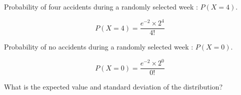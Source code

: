 \documentclass[]{article}
\begin{document}

Probability of four accidents during a randomly selected week : $ P(X = 4)$.

\[ P(X=4) =  \frac{e^{-2} \times 2^4}{4!}  \]



Probability of no accidents during a randomly selected week : $ P(X = 0)$.

\[ P(X=0) =  \frac{e^{-2} \times 2^0}{0!}  \]






What is the expected value and standard deviation of the distribution? 

\end{document}
